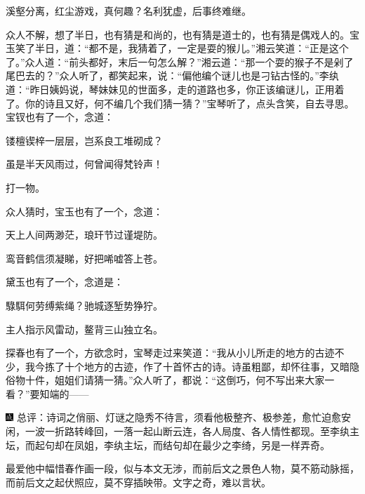 溪壑分离，红尘游戏，真何趣？名利犹虚，后事终难继。

众人不解，想了半日，也有猜是和尚的，也有猜是道士的，也有猜是偶戏人的。宝玉笑了半日，道：“都不是，我猜着了，一定是耍的猴儿。”湘云笑道：“正是这个了。”众人道：“前头都好，末后一句怎么解？”湘云道：“那一个耍的猴子不是剁了尾巴去的？”众人听了，都笑起来，说：“偏他编个谜儿也是刁钻古怪的。”李纨道：“昨日姨妈说，琴妹妹见的世面多，走的道路也多，你正该编谜儿，正用着了。你的诗且又好，何不编几个我们猜一猜？”宝琴听了，点头含笑，自去寻思。宝钗也有了一个，念道：

镂檀锲梓一层层，岂系良工堆砌成？

虽是半天风雨过，何曾闻得梵铃声！

打一物。

众人猜时，宝玉也有了一个，念道：

天上人间两渺茫，琅玕节过谨堤防。

鸾音鹤信须凝睇，好把唏嘘答上苍。

黛玉也有了一个，念道是：

騄駬何劳缚紫绳？驰城逐堑势狰狞。

主人指示风雷动，鳌背三山独立名。

探春也有了一个，方欲念时，宝琴走过来笑道：“我从小儿所走的地方的古迹不少，我今拣了十个地方的古迹，作了十首怀古的诗。诗虽粗鄙，却怀往事，又暗隐俗物十件，姐姐们请猜一猜。”众人听了，都说：“这倒巧，何不写出来大家一看？”要知端的------

{\includegraphics[width=3mm]{../Images/00005}  \kaishu 总评：诗词之俏丽、灯谜之隐秀不待言，须看他极整齐、极参差，愈忙迫愈安闲，一波一折路转峰回，一落一起山断云连，各人局度、各人情性都现。至李纨主坛，而起句却在凤姐，李纨主坛，而结句却在最少之李绮，另是一样弄奇。}

{最爱他中幅惜春作画一段，似与本文无涉，而前后文之景色人物，莫不筋动脉摇，而前后文之起伏照应，莫不穿插映带。文字之奇，难以言状。}
